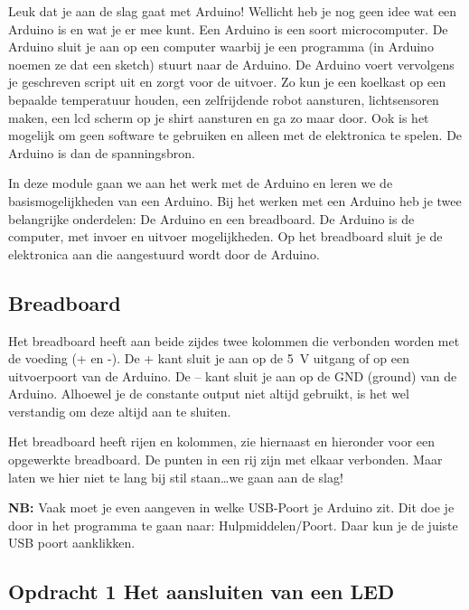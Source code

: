 \documentclass{arduino}
\begin{document}
Leuk dat je aan de slag gaat met Arduino! Wellicht heb je nog geen idee wat een Arduino is en wat je er mee kunt. Een Arduino is een soort microcomputer. De Arduino sluit je aan op een computer waarbij je een programma (in Arduino noemen ze dat een sketch) stuurt naar de Arduino. De Arduino voert vervolgens je geschreven script uit en zorgt voor de uitvoer. Zo kun je een koelkast op een bepaalde temperatuur houden, een zelfrijdende robot aansturen, lichtsensoren maken, een lcd scherm op je shirt aansturen en ga zo maar door. Ook is het mogelijk om geen software te gebruiken en alleen met de elektronica te spelen. De Arduino is dan de spanningsbron.

In deze module gaan we aan het werk met de Arduino en leren we de basismogelijkheden van een Arduino. Bij het werken met een Arduino heb je twee belangrijke onderdelen: De Arduino en een breadboard. De Arduino is de computer, met invoer en uitvoer mogelijkheden. Op het breadboard sluit je de elektronica aan die aangestuurd wordt door de Arduino.

\subsection{Breadboard}

Het breadboard heeft aan beide zijdes twee kolommen die verbonden worden met de voeding (+ en -). De + kant sluit je aan op de \SI{5}{\volt} uitgang of op een uitvoerpoort van de Arduino. De – kant sluit je aan op de GND (ground) van de Arduino. Alhoewel je de constante output niet altijd gebruikt, is het wel verstandig om deze altijd aan te sluiten.

Het breadboard heeft rijen en kolommen, zie hiernaast en hieronder voor een opgewerkte breadboard. De punten in een rij zijn met elkaar verbonden. Maar laten we hier niet te lang bij stil staan\dots we gaan aan de slag!

\textbf{NB:} Vaak moet je even aangeven in welke USB-Poort je Arduino zit. Dit doe je door in het programma te gaan naar: Hulpmiddelen/Poort. Daar kun je de juiste USB poort aanklikken.


\newpage

\subsection{Opdracht 1 Het aansluiten van een LED}
\end{document}
